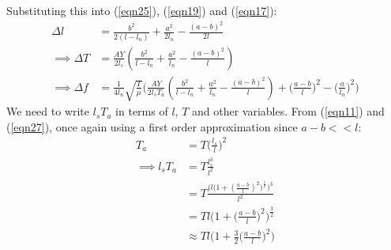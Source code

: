 Substituting this into (\ref{eqn25}), (\ref{eqn19}) and (\ref{eqn17}):
\begin{align}
    \Delta l &= \frac{b^2}{2(l-l_n)} + \frac{a^2}{2l_n} - \frac{(a-b)^2}{2l} \\
    \implies \Delta T &= \frac{AY}{2l_s} \left( \frac{b^2}{l-l_n} + \frac{a^2}{l_n} - \frac{(a-b)^2}{l} \right) \label{eqn31} \\
    \implies \Delta f &= \frac{1}{4l_n} \sqrt{\frac{T}{\mu}} \bigg( \frac{AY}{2l_s T_a} \left( \frac{b^2}{l-l_n} + \frac{a^2}{l_n} - \frac{(a-b)^2}{l} \right) + \bigg(\frac{a-b}{l}\bigg)^2 - \bigg(\frac{a}{l_n} \bigg)^2 \bigg) \label{eqn32}
\end{align}
We need to write $l_s T_a$ in terms of $l$, $T$ and other variables. From (\ref{eqn11}) and (\ref{eqn27}), once again using a first order approximation since $a-b << l$:
\begin{align}
    T_a &= T\bigg(\frac{l_s}{l}\bigg)^2 \\
    \implies l_s T_a &= T \frac{l_s^3}{l^2} \\
    &= T \frac{\Big(l\big(1 + (\frac{a-b}{l})^2\big)^\frac{1}{2}\Big)^3}{l^2} \\
    &= Tl \bigg(1 + \bigg(\frac{a-b}{l}\bigg)^2\bigg)^\frac{3}{2} \\
    &\approx Tl \bigg(1 + \frac{3}{2}\bigg(\frac{a-b}{l}\bigg)^2\bigg) \label{eqn37}
\end{align}